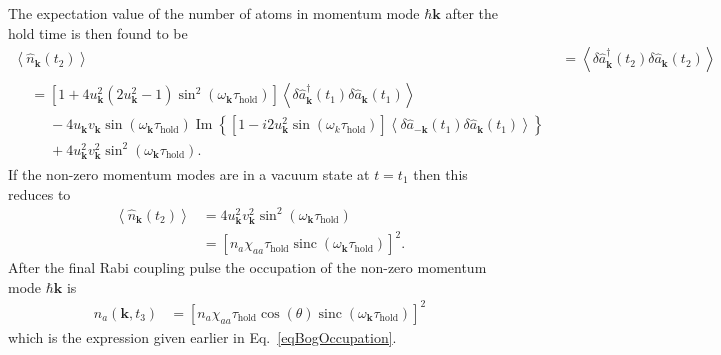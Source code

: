 \documentclass{iopart}
\DeclareMathOperator{\sinc}{sinc}
\newcommand{\expect}[1]{\ensuremath{\left<#1\right>}}
\renewcommand{\Im}{\operatorname{Im}}
\begin{document}
The expectation value of the number of atoms in momentum mode $\hbar\mathbf{k}$ after the hold time is then found to be
\begin{align}
  \expect{\hat{n}_\mathbf{k}(t_2)} &= \expect{\delta\hat{a}^\dagger_\mathbf{k}(t_2) \delta\hat{a}_\mathbf{k}(t_2)} \\
  \begin{split}
  &=\left[1 + 4 u_\mathbf{k}^2(2 u_\mathbf{k}^2 - 1)\sin^2(\omega_\mathbf{k} \tau_\text{hold})\right] \expect{\delta \hat{a}^\dagger_\mathbf{k}(t_1) \delta\hat{a}_\mathbf{k}(t_1)} \\
  &\phantom{\mathrel{=}}- 4 u_\mathbf{k} v_\mathbf{k} \sin(\omega_\mathbf{k}\tau_\text{hold}) \Im\left\{\left[1-i2 u_\mathbf{k}^2 \sin(\omega_k \tau_\text{hold})\right] \expect{\delta\hat{a}_{-\mathbf{k}}(t_1) \delta\hat{a}_\mathbf{k}(t_1)}\right\}\\
  &\phantom{\mathrel{=}} + 4 u_\mathbf{k}^2 v_\mathbf{k}^2 \sin^2(\omega_\mathbf{k}\tau_\text{hold}).
  \end{split}
\end{align}
If the non-zero momentum modes are in a vacuum state at $t=t_1$ then this reduces to
\begin{align}
  \expect{\hat{n}_\mathbf{k}(t_2)} &= 4 u_\mathbf{k}^2 v_\mathbf{k}^2 \sin^2(\omega_\mathbf{k}\tau_\text{hold}) \\
  &= \left[n_a \chi_{aa} \tau_\text{hold} \sinc(\omega_\mathbf{k} \tau_\text{hold}) \right]^2.
\end{align}
After the final Rabi coupling pulse the occupation of the non-zero momentum mode $\hbar\mathbf{k}$ is
\begin{align}
  n_a(\mathbf{k}, t_3) &= \left[n_a \chi_{aa} \tau_\text{hold} \cos(\theta)\sinc(\omega_\mathbf{k} \tau_\text{hold}) \right]^2
\end{align}
which is the expression given earlier in Eq.~\eqref{eqBogOccupation}.
\end{document}
